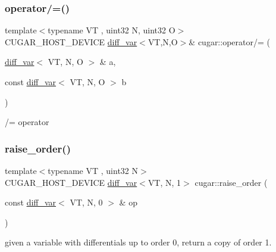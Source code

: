 \subsubsection{\texorpdfstring{operator/=()}{operator/=()}}
{\footnotesize\ttfamily template$<$typename VT , uint32 N, uint32 O$>$ \\
C\+U\+G\+A\+R\+\_\+\+H\+O\+S\+T\+\_\+\+D\+E\+V\+I\+CE \hyperlink{structcugar_1_1diff__var}{diff\+\_\+var}$<$VT,N,O$>$\& cugar\+::operator/= (\begin{DoxyParamCaption}\item[{\hyperlink{structcugar_1_1diff__var}{diff\+\_\+var}$<$ VT, N, O $>$ \&}]{a,  }\item[{const \hyperlink{structcugar_1_1diff__var}{diff\+\_\+var}$<$ VT, N, O $>$}]{b }\end{DoxyParamCaption})\hspace{0.3cm}{\ttfamily [inline]}}

/= operator \mbox{\label{group___auto_diff_module_gadb5d2fdd94aac834a5eabdd1a8497be2}} 
\subsubsection{\texorpdfstring{raise\+\_\+order()}{raise\_order()}\hspace{0.1cm}{\footnotesize\ttfamily [1/5]}}
{\footnotesize\ttfamily template$<$typename VT , uint32 N$>$ \\
C\+U\+G\+A\+R\+\_\+\+H\+O\+S\+T\+\_\+\+D\+E\+V\+I\+CE \hyperlink{structcugar_1_1diff__var}{diff\+\_\+var}$<$VT, N, 1$>$ cugar\+::raise\+\_\+order (\begin{DoxyParamCaption}\item[{const \hyperlink{structcugar_1_1diff__var}{diff\+\_\+var}$<$ VT, N, 0 $>$ \&}]{op }\end{DoxyParamCaption})\hspace{0.3cm}{\ttfamily [inline]}}

given a variable with differentials up to order 0, return a copy of order 1. \mbox{\label{group___auto_diff_module_ga72857305c1e63bb7b253731201a98d00}} 
